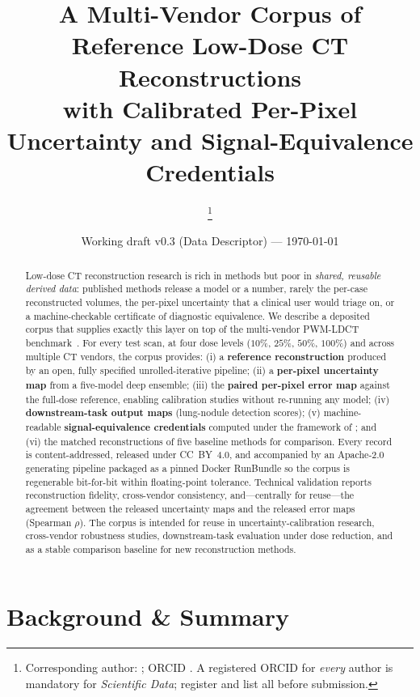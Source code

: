 \documentclass{article}
\title{\textbf{A Multi-Vendor Corpus of Reference Low-Dose CT Reconstructions \\ with Calibrated Per-Pixel Uncertainty and Signal-Equivalence Credentials}}
\author[1,2]{\todo{First A. Author}\thanks{Corresponding author: \todo{email@utsouthwestern.edu}; ORCID \todo{0000-0000-0000-0000}. A registered ORCID for \emph{every} author is mandatory for \emph{Scientific Data}; register and list all before submission.}}
\author[1]{\todo{Second B. Author}}
\author[2]{\todo{Third C. Author}}
\affil[1]{University of Texas Southwestern Medical Center, Dallas, TX, USA}
\affil[2]{PWM Protocol Foundation}
\date{Working draft v0.3 (Data Descriptor) --- \today}
\begin{document}
\maketitle

\begin{abstract}
\noindent
Low-dose CT reconstruction research is rich in methods but poor in
\emph{shared, reusable derived data}: published methods release a model
or a number, rarely the per-case reconstructed volumes, the per-pixel
uncertainty that a clinical user would triage on, or a machine-checkable
certificate of diagnostic equivalence. We describe a deposited corpus
that supplies exactly this layer on top of the multi-vendor PWM-LDCT
benchmark~\citep{ws1dataset}. For every test scan, at four dose levels
($10\%$, $25\%$, $50\%$, $100\%$) and across multiple CT vendors, the
corpus provides: (i) a \textbf{reference reconstruction} produced by an
open, fully specified unrolled-iterative pipeline; (ii) a
\textbf{per-pixel uncertainty map} from a five-model deep ensemble; (iii)
the \textbf{paired per-pixel error map} against the full-dose reference,
enabling calibration studies without re-running any model; (iv)
\textbf{downstream-task output maps} (lung-nodule detection scores); (v)
machine-readable \textbf{signal-equivalence credentials} computed under
the framework of \citet{ws2framework}; and (vi) the matched
reconstructions of five baseline methods for comparison. Every record is
content-addressed, released under CC~BY~4.0, and accompanied by an
Apache-2.0 generating pipeline packaged as a pinned Docker RunBundle so
the corpus is regenerable bit-for-bit within floating-point tolerance.
Technical validation reports reconstruction fidelity, cross-vendor
consistency, and---centrally for reuse---the agreement between the
released uncertainty maps and the released error maps (Spearman $\rho$).
The corpus is intended for reuse in uncertainty-calibration research,
cross-vendor robustness studies, downstream-task evaluation under dose
reduction, and as a stable comparison baseline for new reconstruction
methods.
\end{abstract}

\section{Background \& Summary}
\label{sec:background}
\end{document}
